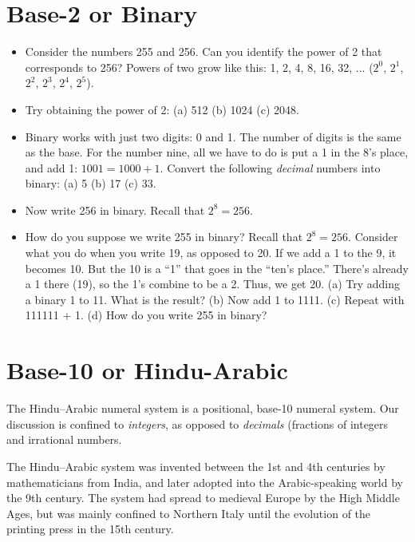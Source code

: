 \documentclass[12pt]{article}
\begin{document}
\section{Base-2 or Binary}

\begin{itemize}
\item Consider the numbers 255 and 256.  Can you identify the power of 2 that corresponds to 256?  Powers of two grow like this: 1, 2, 4, 8, 16, 32, ... ($2^0$, $2^1$, $2^2$, $2^3$, $2^4$, $2^5$). \\ \vspace{1cm}
\item Try obtaining the power of 2: (a) 512 (b) 1024 (c) 2048. \\ \vspace{1cm} 
\item Binary works with just two digits: 0 and 1.  The number of digits is the same as the base.  For the number nine, all we have to do is put a 1 in the 8's place, and add 1: $1001 = 1000 + 1$.  Convert the following \textit{decimal} numbers into binary: (a) 5 (b) 17 (c) 33. \\ \vspace{1.5cm}
\item Now write 256 in binary.  Recall that $2^8 = 256$. \\ \vspace{1cm}
\item How do you suppose we write 255 in binary?  Recall that $2^8 = 256$. Consider what you do when you write 19, as opposed to 20.  If we add a 1 to the 9, it becomes 10.  But the 10 is a ``1'' that goes in the ``ten's place.''  There's already a 1 there (19), so the 1's combine to be a 2.  Thus, we get 20.  (a) Try adding a binary 1 to 11.  What is the result?  (b) Now add 1 to 1111.  (c) Repeat with 111111 + 1.  (d) How do you write 255 in binary?  \\ \vspace{2cm}
\end{itemize}

\section{Base-10 or Hindu-Arabic}

The Hindu–Arabic numeral system is a positional, base-10 numeral system.  Our discussion is confined to \textit{integers}, as opposed to \textit{decimals} (fractions of integers and irrational numbers.

The Hindu–Arabic system was invented between the 1st and 4th centuries by mathematicians from India, and later adopted into the Arabic-speaking world by the 9th century. The system had spread to medieval Europe by the High Middle Ages, but was mainly confined to Northern Italy until the evolution of the printing press in the 15th century.
\end{document}
